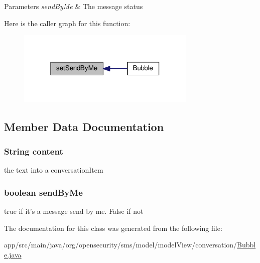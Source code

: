 \begin{DoxyParams}{Parameters}
{\em send\+By\+Me} & The message status \\
\hline
\end{DoxyParams}


Here is the caller graph for this function\+:
\nopagebreak
\begin{figure}[H]
\begin{center}
\leavevmode
\includegraphics[width=242pt]{a00004_a10871b9b5592dcf11e26eaed8e407682_icgraph}
\end{center}
\end{figure}




\subsection{Member Data Documentation}
\hypertarget{a00004_a5afce1c98d73512f8ffcb0482df23708}{
\subsubsection[{content}]{\setlength{\rightskip}{0pt plus 5cm}String content\hspace{0.3cm}{\ttfamily [private]}}}\label{a00004_a5afce1c98d73512f8ffcb0482df23708}
the text into a conversation\+Item \hypertarget{a00004_a87564ae3e1ae394e9b16de538dbf8067}{
\subsubsection[{send\+By\+Me}]{\setlength{\rightskip}{0pt plus 5cm}boolean send\+By\+Me\hspace{0.3cm}{\ttfamily [private]}}}\label{a00004_a87564ae3e1ae394e9b16de538dbf8067}
true if it's a message send by me. False if not 

The documentation for this class was generated from the following file\+:\begin{DoxyCompactItemize}
\item 
app/src/main/java/org/opensecurity/sms/model/model\+View/conversation/\hyperlink{a00019}{Bubble.\+java}\end{DoxyCompactItemize}
